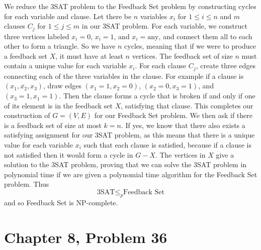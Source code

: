 \documentclass[12pt]{article}
\begin{document}
We reduce the 3SAT problem to the Feedback Set problem by constructing cycles for each variable and clause. Let there be
\(n\) variables \(x_i\) for \(1\leq i \leq n\) and \(m\) clauses \(C_j\) for \(1\leq j\leq m\) in our 3SAT problem. For each
variable, we construct three vertices labeled \(x_i=0\), \(x_i=1\), and \(x_i=\text{any}\), and connect them all to each other to
form a triangle. So we have \(n\) cycles, meaning that if we were to produce a feedback set \(X\), it must have at least \(n\)
vertices. The feedback set of size \(n\) must contain a unique value for each variable \(x_i\). For each clause \(C_j\), create
three edges connecting each of the three variables in the clause. For example if a clause is \((x_1,\overline{x_2},x_3)\), draw
edges \((x_1=1, x_2=0)\), \((x_2=0, x_3=1)\), and \((x_3=1, x_1=1)\). Then the clause forms a cycle that is broken if and only
if one of its element is in the feedback set \(X\), satisfying that clause. This completes our construction of \(G=(V,E)\) for our
Feedback Set problem. We then ask if there is a feedback set of size at most \(k=n\). If yes, we know that there also exists a
satisfying assignment for our 3SAT problem, as this means that there is a unique value for each variable \(x_i\) such that each clause
is satisfied, because if a clause is not satisfied then it would form a cycle in \(G-X\). The vertices in \(X\) give a solution to the
3SAT problem, proving that we can solve the 3SAT problem in polynomial time if we are given a polynomial time algorithm for the Feedback
Set problem. Thus
\[\text{3SAT}\leq_p \text{Feedback Set}\]
and so Feedback Set is NP-complete.

\pagebreak

\section*{Chapter 8, Problem 36}
\end{document}
